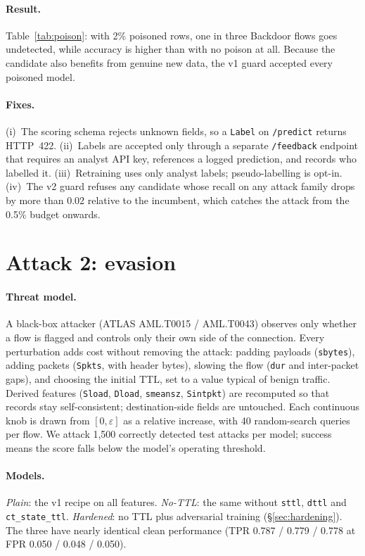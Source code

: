\documentclass[11pt,a4paper]{article}
\newcommand{\code}[1]{\texttt{#1}}
\begin{document}
\paragraph{Result.} Table~\ref{tab:poison}: with 2\% poisoned rows, one in
three Backdoor flows goes undetected, while accuracy is higher than with no
poison at all. Because the candidate also benefits from genuine new data, the
v1 guard accepted every poisoned model.

\paragraph{Fixes.} (i)~The scoring schema rejects unknown fields, so a
\code{Label} on \code{/predict} returns HTTP~422. (ii)~Labels are accepted
only through a separate \code{/feedback} endpoint that requires an analyst
API key, references a logged prediction, and records who labelled it.
(iii)~Retraining uses only analyst labels; pseudo-labelling is opt-in.
(iv)~The v2 guard refuses any candidate whose recall on any attack family
drops by more than 0.02 relative to the incumbent, which catches the attack
from the 0.5\% budget onwards.

\section{Attack 2: evasion}
\label{sec:evasion}

\paragraph{Threat model.} A black-box attacker (ATLAS AML.T0015 / AML.T0043)
observes only whether a flow is flagged and controls only their own side of
the connection. Every perturbation adds cost without removing the attack:
padding payloads (\code{sbytes}), adding packets (\code{Spkts}, with header
bytes), slowing the flow (\code{dur} and inter-packet gaps), and choosing
the initial TTL, set to a value typical of benign traffic. Derived features
(\code{Sload}, \code{Dload}, \code{smeansz}, \code{Sintpkt}) are recomputed
so that records stay self-consistent; destination-side fields are untouched.
Each continuous knob is drawn from $[0,\varepsilon]$ as a relative increase,
with 40 random-search queries per flow. We attack 1,500 correctly detected
test attacks per model; success means the score falls below the model's
operating threshold.

\paragraph{Models.} \emph{Plain}: the v1 recipe on all features.
\emph{No-TTL}: the same without \code{sttl}, \code{dttl} and
\code{ct\_state\_ttl}. \emph{Hardened}: no TTL plus adversarial training
(\S\ref{sec:hardening}). The three have nearly identical clean performance
(TPR 0.787 / 0.779 / 0.778 at FPR 0.050 / 0.048 / 0.050).
\end{document}
